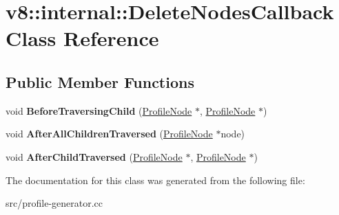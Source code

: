 \hypertarget{classv8_1_1internal_1_1_delete_nodes_callback}{}\section{v8\+:\+:internal\+:\+:Delete\+Nodes\+Callback Class Reference}
\label{classv8_1_1internal_1_1_delete_nodes_callback}
\subsection*{Public Member Functions}
\begin{DoxyCompactItemize}
\item 
\hypertarget{classv8_1_1internal_1_1_delete_nodes_callback_abedf62098500aa0f61137db8e47430fe}{}void {\bfseries Before\+Traversing\+Child} (\hyperlink{classv8_1_1internal_1_1_profile_node}{Profile\+Node} $\ast$, \hyperlink{classv8_1_1internal_1_1_profile_node}{Profile\+Node} $\ast$)\label{classv8_1_1internal_1_1_delete_nodes_callback_abedf62098500aa0f61137db8e47430fe}

\item 
\hypertarget{classv8_1_1internal_1_1_delete_nodes_callback_aaf4155f73f4855c26b2ecee5740eadbb}{}void {\bfseries After\+All\+Children\+Traversed} (\hyperlink{classv8_1_1internal_1_1_profile_node}{Profile\+Node} $\ast$node)\label{classv8_1_1internal_1_1_delete_nodes_callback_aaf4155f73f4855c26b2ecee5740eadbb}

\item 
\hypertarget{classv8_1_1internal_1_1_delete_nodes_callback_a59823e985d117a4d8429e0d198f288bf}{}void {\bfseries After\+Child\+Traversed} (\hyperlink{classv8_1_1internal_1_1_profile_node}{Profile\+Node} $\ast$, \hyperlink{classv8_1_1internal_1_1_profile_node}{Profile\+Node} $\ast$)\label{classv8_1_1internal_1_1_delete_nodes_callback_a59823e985d117a4d8429e0d198f288bf}

\end{DoxyCompactItemize}


The documentation for this class was generated from the following file\+:\begin{DoxyCompactItemize}
\item 
src/profile-\/generator.\+cc\end{DoxyCompactItemize}
